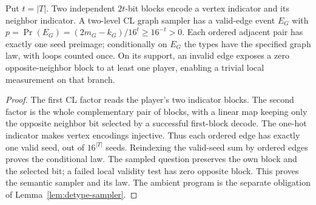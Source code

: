 \begin{lemma}
\label{lem:detype-graph}
\leanok
Put $t=|T|$. Two independent $2t$-bit blocks encode a vertex indicator and
its neighbor indicator. A two-level CL graph sampler has a valid-edge event
$E_G$ with
$p=\Pr(E_G)=(2m_G-k_G)/16^t\geq16^{-t}>0$.
Each ordered adjacent pair has exactly one seed preimage; conditionally on
$E_G$ the types have the specified graph law, with loops counted once.
On its support, an invalid edge exposes a zero opposite-neighbor block to
at least one player, enabling a trivial local measurement on that branch.
\end{lemma}
\begin{proof}
\leanok
The first CL factor reads the player's two indicator blocks. The second
factor is the whole complementary pair of blocks, with a linear map keeping
only the opposite neighbor bit selected by a successful first-block decode.
The one-hot indicator makes vertex encodings injective. Thus each ordered
edge has exactly one valid seed, out of $16^{|T|}$ seeds. Reindexing the
valid-seed sum by ordered edges proves the conditional law. The sampled
question preserves the own block and the selected bit; a failed local
validity test has zero opposite block. This proves the semantic sampler
and its law. The ambient program is the separate obligation of
Lemma~\ref{lem:detype-sampler}.
\end{proof}

